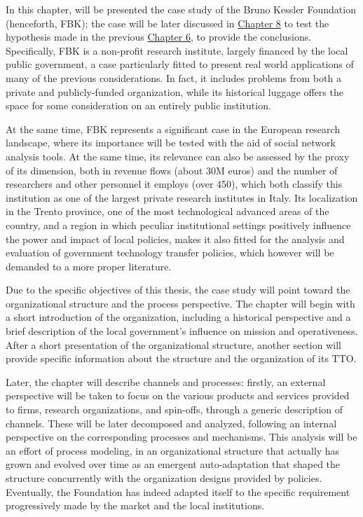 

\label{Chapter7}

In this chapter, will be presented the case study of the Bruno Kessler Foundation (henceforth, FBK); the case will be later discussed in \hyperref[Chapter8]{Chapter 8} to test the hypothesis made in the previous \hyperref[Chapter6]{Chapter 6}, to provide the conclusions. Specifically, FBK is a non-profit research institute, largely financed by the local public government, a case particularly fitted to present real world applications of many of the previous considerations. In fact, it includes problems from both a private and publicly-funded organization, while its historical luggage offers the space for some consideration on an entirely public institution. 

At the same time, FBK represents a significant case in the European research landscape, where its importance will be tested with the aid of social network analysis tools. At the same time, its relevance can also be assessed by the proxy of its dimension, both in revenue flows (about 30M euros) and the number of researchers and other personnel it employs (over 450), which both classify this institution as one of the largest private research institutes in Italy. Its localization in the Trento province, one of the most technological advanced areas of the country, and a region in which peculiar institutional settings positively influence the power and impact of local policies, makes it also fitted for the analysis and evaluation of government technology transfer policies, which however will be demanded to a more proper literature.

Due to the specific objectives of this thesis, the case study will point toward the organizational structure and the process perspective. The chapter will begin with a short introduction of the organization, including a historical perspective and a brief description of the local government's influence on mission and operativeness. After a short presentation of the organizational structure, another section will provide specific information about the structure and the organization of its TTO.

Later, the chapter will describe channels and processes: firstly, an external perspective will be taken to focus on the various products and services provided to firms, research organizations, and spin-offs, through a generic description of channels. These will be later decomposed and analyzed, following an internal perspective on the corresponding processes and mechanisms. This analysis will be an effort of process modeling, in an organizational structure that actually has grown and evolved over time as an emergent auto-adaptation that shaped the structure concurrently with the organization designs provided by policies. Eventually, the Foundation has indeed adapted itself to the specific requirement progressively made by the market and the local institutions. 

